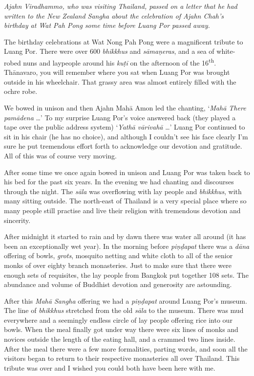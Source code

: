 
\emph{Ajahn Viradhammo, who was visiting Thailand, passed on a
letter that he had written to the New Zealand Sangha about the
celebration of Ajahn Chah's birthday at Wat Pah Pong some time before
Luang Por passed away.}

The birthday celebrations at Wat Nong Pah Pong were a magnificent
tribute to Luang Por. There were over 600 \emph{bhikkhus} and
\emph{sāmaṇeras}, and a sea of white-robed nuns and laypeople around his
\emph{kuṭī} on the afternoon of the 16\textsuperscript{th}. Thānavaro,
you will remember where you sat when Luang Por was brought outside in
his wheelchair. That grassy area was almost entirely filled with the
ochre robe.

We bowed in unison and then Ajahn Mahā Amon led the chanting, `\emph{Mahā There
pamādena} \ldots{}' To my surprise Luang Por's voice answered back (they played
a tape over the public address system) `\emph{Yathā vārivahā} \ldots{}' Luang
Por continued to sit in his chair (he has no choice), and although I couldn't
see his face clearly I'm sure he put tremendous effort forth to acknowledge our
devotion and gratitude. All of this was of course very moving.

After some time we once again bowed in unison and Luang Por was taken
back to his bed for the past six years. In the evening we had chanting
and discourses through the night. The \emph{sāla} was overflowing with
lay people and \emph{bhikkhus}, with many sitting outside. The
north-east of Thailand is a very special place where so many people
still practise and live their religion with tremendous devotion and
sincerity.

After midnight it started to rain and by dawn there was water all around
 (it has been an exceptionally wet year). In the morning before
\emph{piṇḍapat} there was a \emph{dāna} offering of bowls, \emph{grots},
mosquito netting and white cloth to all of the senior monks of over
eighty branch monasteries. Just to make sure that there were enough sets
of requisites, the lay people from Bangkok put together 108 sets. The
abundance and volume of Buddhist devotion and generosity are astounding.

After this \emph{Mahā Sangha} offering we had a \emph{piṇḍapat} around
Luang Por's museum. The line of \emph{bhikkhus} stretched from the old
\emph{sāla} to the museum. There was mud everywhere and a seemingly
endless circle of lay people offering rice into our bowls. When the meal
finally got under way there were six lines of monks and novices outside
the length of the eating hall, and a crammed two lines inside. After the
meal there were a few more formalities, parting words, and soon all the
visitors began to return to their respective monasteries all over
Thailand. This tribute was over and I wished you could both have been
here with me. 

